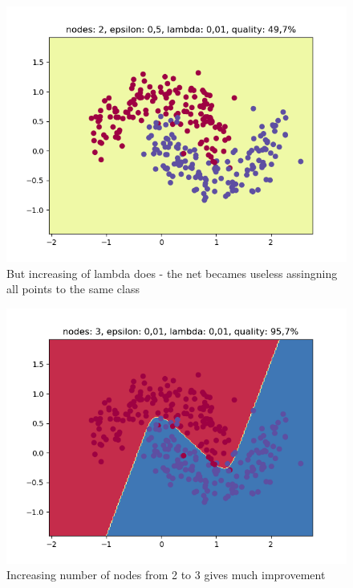 \documentclass[3p,twocolumn]{elsarticle}
\begin{document}
\begin{figure}[h]
\label{fig:fig4}
  \includegraphics[width=\linewidth]{wykresy/5.png}
	\caption{But increasing of lambda does - the net becames useless assingning all points to the same class}
	\label{fig4}
\end{figure}

\begin{figure}[h]
\label{fig:fig5}
  \includegraphics[width=\linewidth]{wykresy/7.png}
	\caption{ Increasing number of nodes from 2 to 3 gives much improvement}
	\label{fig5}
\end{figure}
\end{document}
